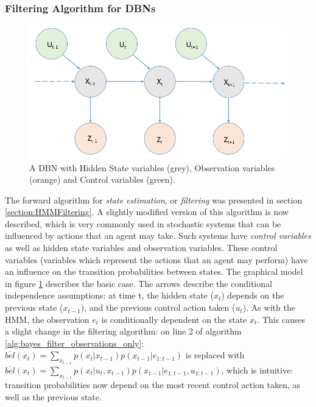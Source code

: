 \subsubsection{Filtering Algorithm for DBNs}
\begin{figure}
    \centering
    \includegraphics[width = 0.65\linewidth]{Chapters/MultiAgentTargetDetection/BayesianFiltering/Figs/HMMs/HMMWithControl.png}
    \caption{A DBN with Hidden State variables (grey), Observation variables (orange) and Control variables (green).}
    \label{fig:HMMWithControlVariablesExample}
\end{figure}
The forward algorithm for \textit{state estimation}, or \textit{filtering} was presented in section \ref{section:HMMFiltering}. A slightly modified version of this algorithm is now described, which is very commonly used in stochastic systems that can be influenced by actions that an agent may take. Such systems have \textit{control variables} as well as hidden state variables and observation variables. These control variables (variables which represent the actions that an agent may perform) have an influence on the transition probabilities between states. The graphical model in figure \ref{fig:HMMWithControlVariablesExample} describes the basic case. The arrows describe the conditional independence assumptions: at time t, the hidden state ($x_t$) depends on the previous state ($x_{t-1}$), and the previous control action taken ($u_t$). As with the HMM, the observation $e_t$ is conditionally dependent on the state $x_t$. This causes a slight change in the filtering algorithm: on line 2 of algorithm \ref{alg:bayes_filter_observations_only}: $\overline{bel}(x_t) = \sum_{x_{t-1}} p(x_t | x_{t-1}) p(x_{t-1} | e_{1:t-1}) $ is replaced with $\overline{bel}(x_t) = \sum_{x_{t-1}} p(x_t | u_t, x_{t-1}) p(x_{t-1} | e_{1:t-1}, u_{1:t-1}) $, which is intuitive: transition probabilities now depend on the most recent control action taken, as well as the previous state.





